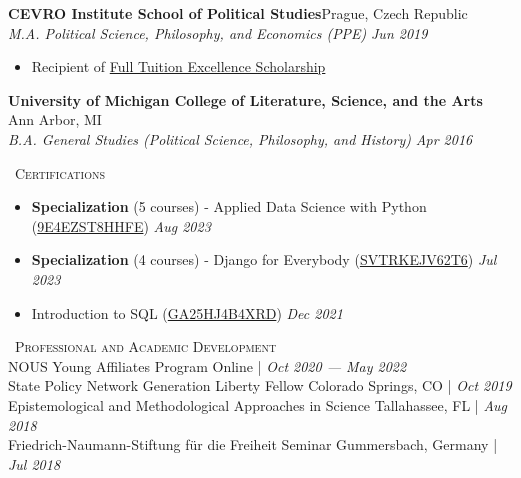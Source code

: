 \documentclass[a4paper,11pt]{article}
\newcommand{\header} [1] {
    \vspace*{1mm}
    {\textsc{\large{\xrfill[0.1ex]{0.5pt}~#1~\xrfill[0.1ex]{0.5pt}}}} %
    \vspace*{1mm}
}
\begin{document}
\textbf{CEVRO Institute School of Political Studies}\hfill Prague, Czech Republic\\
\textit{M.A. Political Science, Philosophy, and Economics (PPE)} \hfill  \emph{Jun 2019}\\
\begin{itemize}
    \item Recipient of \href{http://www.cevroinstitut.cz/en/article/scholarships/}{Full Tuition Excellence Scholarship}
\end{itemize}

\textbf{University of Michigan College of Literature, Science, and the Arts} \hfill Ann Arbor, MI\\
\textit{B.A. General Studies (Political Science, Philosophy, and History)} \hfill  \emph{Apr 2016}\\

\vspace{1mm}
\header{Certifications} \\
\begin{itemize}
    \item \textbf{Specialization} (5 courses) - Applied Data Science with Python (\href{https://www.coursera.org/account/accomplishments/specialization/9E4EZST8HHFE}{9E4EZST8HHFE}) \hfill \emph{Aug 2023}
    \item \textbf{Specialization} (4 courses) - Django for Everybody (\href{https://www.coursera.org/account/accomplishments/specialization/SVTRKEJV62T6}{SVTRKEJV62T6}) \hfill \emph{Jul 2023}
    \item Introduction to SQL (\href{https://www.coursera.org/account/accomplishments/verify/GA25HJ4B4XRD}{GA25HJ4B4XRD}) \hfill  \emph{Dec 2021}
\end{itemize}
\vspace{1mm}
\header{Professional and Academic Development} \\

NOUS Young Affiliates Program \hfill Online |  \emph{Oct 2020 --- May 2022} \\

State Policy Network Generation Liberty Fellow \hfill Colorado Springs, CO |  \emph{Oct 2019} \\

Epistemological and Methodological Approaches in Science \hfill Tallahassee, FL |  \emph{Aug 2018} \\

Friedrich-Naumann-Stiftung f\"{u}r die Freiheit Seminar \hfill Gummersbach, Germany |  \emph{Jul 2018} \\
\end{document}
